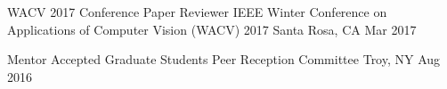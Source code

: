 

\begin{cventries} %

  \cventryshort %
    {WACV 2017 Conference Paper Reviewer} %
    {IEEE Winter Conference on Applications of Computer Vision (WACV) 2017} %
    {Santa Rosa, CA} %
    {Mar 2017} %

  \cventryshort %
    {Mentor} %
    {Accepted Graduate Students Peer Reception Committee} %
    {Troy, NY} %
    {Aug 2016} %

\end{cventries} %
